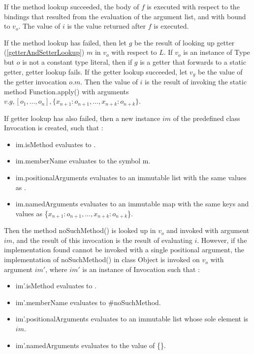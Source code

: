 \documentclass{article}
\newcommand{\code}[1]{{\sf #1}}
\begin{document}
\LMHash{}
If the method lookup succeeded, the body of $f$ is executed with respect to the bindings that resulted from the evaluation of the argument list, and with \THIS{} bound to $v_o$. The value of $i$ is the value returned after $f$ is executed.

\LMHash{}
If the method lookup has failed, then let $g$ be the result of looking up getter (\ref{getterAndSetterLookup}) $m$ in $v_o$ with respect to $L$. 
If $v_o$ is an instance of \code{Type} but $o$ is not a constant type literal, then if $g$ is a getter that forwards to a static getter, getter lookup fails.
If the getter lookup succeeded, let $v_g$ be the value of the getter invocation $o.m$. Then the value of $i$ is the result of invoking 
the static method \code{Function.apply()} with arguments $v.g, [o_1, \ldots , o_n], \{x_{n+1}: o_{n+1}, \ldots , x_{n+k}: o_{n+k}\}$.

\LMHash{}
If  getter lookup has also failed, then a new instance $im$  of the predefined class  \code{Invocation}  is created, such that :
\begin{itemize}
\item  \code{im.isMethod} evaluates to \code{\TRUE{}}.
\item  \code{im.memberName} evaluates to the symbol \code{m}.
\item \code{im.positionalArguments} evaluates to an immutable list with the same values as  \code{[$o_1, \ldots, o_n$]}.
\item \code{im.namedArguments} evaluates to an immutable map with the same keys and values as \code{\{$x_{n+1}: o_{n+1}, \ldots, x_{n+k} : o_{n+k}$\}}.
\end{itemize}

\LMHash{}
Then the method \code{noSuchMethod()} is looked up in $v_o$ and invoked with argument $im$, and the result of this invocation is the result of evaluating $i$. However, if the implementation found cannot be invoked with a single positional argument, the implementation  of \code{noSuchMethod()} in class \code{Object} is invoked on $v_o$ with argument $im'$, where $im'$ is an instance of \code{Invocation} such that :
\begin{itemize}
\item  \code{im'.isMethod} evaluates to \code{\TRUE{}}.
\item  \code{im'.memberName} evaluates to \code{\#noSuchMethod}.
\item \code{im'.positionalArguments} evaluates to an immutable list whose sole element is  $im$.
\item \code{im'.namedArguments} evaluates to the value of \code{\CONST{} \{\}}.
\end{itemize}
\end{document}
